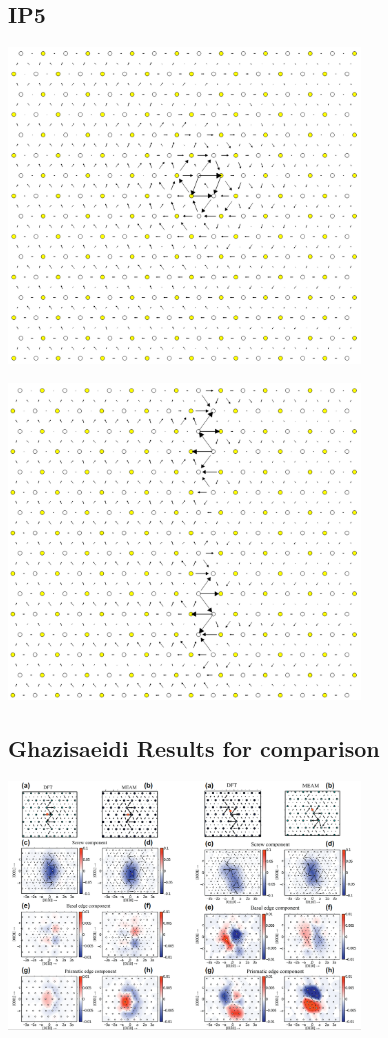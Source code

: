 \documentclass[11pt]{article}
\begin{document}
\subsection{IP5}
\label{sec:org3806fd4}
\begin{center}
\includegraphics[width=0.7\textwidth]{Images/final_model_IP5_partial_dd_initial.png}
\end{center}
\begin{center}
\includegraphics[width=0.7\textwidth]{Images/final_model_IP5_partial_dd_final.png}
\end{center}

\subsection{Ghazisaeidi Results for comparison}
\label{sec:orgfa7c439}

\begin{center}
\includegraphics[width=0.7\textwidth]{Images/ghazisaiedi-trinkle-scew-dislocation-core-prism-symm-asymm.png}
\end{center}
\end{document}
